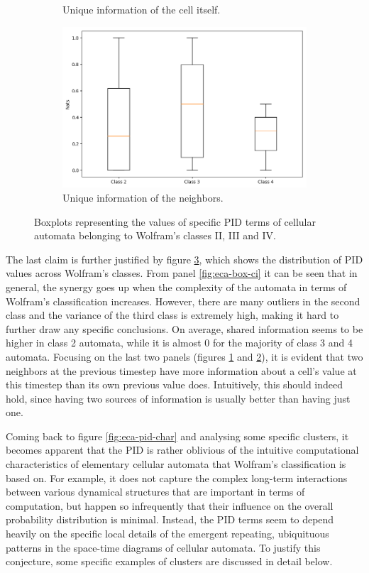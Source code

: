 \documentclass[12pt]{article}
\begin{document}
\begin{figure} [!h]
\begin{subfigure}{.5\textwidth}
  \caption{Unique information of the cell itself.}
  \label{fig:eca-box-ui-y}
\end{subfigure}
\begin{subfigure}{.5\textwidth}
  \centering
  \includegraphics[width=.9\linewidth]{eca-box-ui-z}
  \caption{Unique information of the neighbors.}
  \label{fig:eca-box-ui-z}
\end{subfigure}
\caption{Boxplots representing the values of specific PID terms of cellular automata belonging to Wolfram's classes II, III and IV.}
\label{fig:eca-boxplots}
\end{figure}

The last claim is further justified by figure \ref{fig:eca-boxplots}, which shows the distribution of PID values across Wolfram's classes. From panel \ref{fig:eca-box-ci} it can be seen that in general, the synergy goes up when the complexity of the automata in terms of Wolfram's classification increases. However, there are many outliers in the second class and the variance of the third class is extremely high, making it hard to further draw any specific conclusions. On average, shared information seems to be higher in class 2 automata, while it is almost 0 for the majority of class 3 and 4 automata. Focusing on the last two panels (figures \ref{fig:eca-box-ui-y} and \ref{fig:eca-box-ui-z}), it is evident that two neighbors at the previous timestep have more information about a cell's value at this timestep than its own previous value does. Intuitively, this should indeed hold, since having two sources of information is usually better than having just one. 

Coming back to figure \ref{fig:eca-pid-char} and analysing some specific clusters, it becomes apparent that the PID is rather oblivious of the intuitive computational characteristics of elementary cellular automata that Wolfram's classification is based on. For example, it does not capture the complex long-term interactions between various dynamical structures that are important in terms of computation, but happen so infrequently that their influence on the overall probability 	distribution is minimal. Instead, the PID terms seem to depend heavily on the specific local details of the emergent repeating, ubiquituous patterns in the space-time diagrams of cellular automata. To justify this conjecture, some specific examples of clusters are discussed in detail below. 
\end{document}
